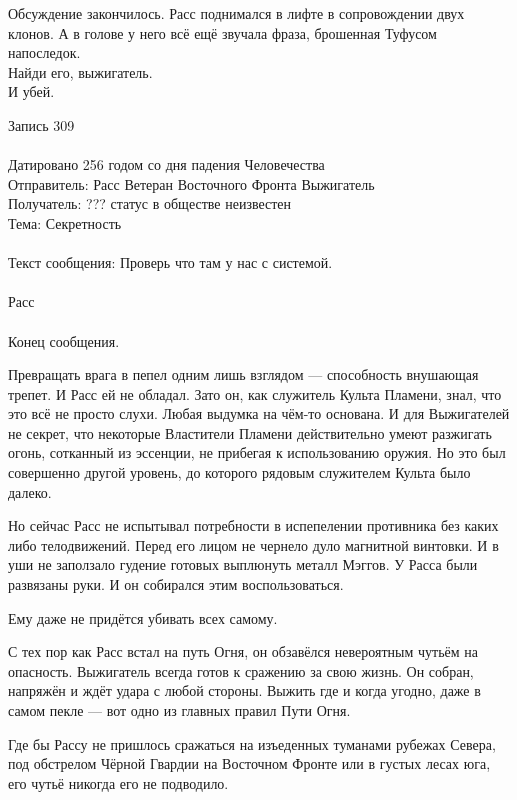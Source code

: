 Обсуждение закончилось. Расс поднимался в лифте в сопровождении двух клонов. А в 
голове у него всё ещё звучала фраза, брошенная Туфусом напоследок.\\

Найди его, выжигатель.\\

И убей.\\

\newpage

\begin{mssg}{%
Запись 309\\
\\
Датировано 256 годом со дня падения Человечества\\
Отправитель: Расс Ветеран Восточного Фронта Выжигатель\\
Получатель: ??? статус в обществе неизвестен\\
Тема: Секретность\\
\\
Текст сообщения:
}
Проверь что там у нас с системой.\\
\\
Расс\\
\\
Конец сообщения.
\end{mssg}

Превращать врага в пепел одним лишь взглядом --- способность внушающая трепет. 
И Расс ей не обладал. Зато он, как служитель Культа Пламени, знал, что это всё 
не просто слухи. Любая выдумка на чём-то основана. И для Выжигателей не секрет, 
что некоторые Властители Пламени действительно умеют разжигать огонь, сотканный 
из эссенции, не прибегая к использованию оружия. Но это был совершенно другой 
уровень, до которого рядовым служителем Культа было далеко.

Но сейчас Расс не испытывал потребности в испепелении противника без каких либо 
телодвижений. Перед его лицом не чернело дуло магнитной винтовки. И в уши не 
заползало гудение готовых выплюнуть металл Мэггов. У Расса были развязаны руки. 
И он собирался этим воспользоваться.

Ему даже не придётся убивать всех самому.

С тех пор как Расс встал на путь Огня, он обзавёлся невероятным чутьём на 
опасность. Выжигатель всегда готов к сражению за свою жизнь. Он собран, напряжён 
и ждёт удара с любой стороны. Выжить где и когда угодно, даже в самом пекле --- 
вот одно из главных правил Пути Огня.

Где бы Рассу не пришлось сражаться на изъеденных туманами рубежах Севера, под 
обстрелом Чёрной Гвардии на Восточном Фронте или в густых лесах юга, его чутьё 
никогда его не подводило.


